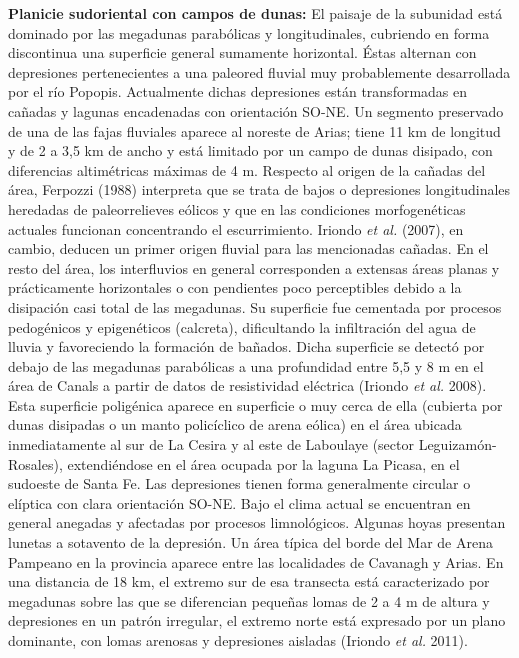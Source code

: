 \documentclass[10pt,a4paper, twoside]{report}
\begin{document}
\textbf{Planicie sudoriental con campos de dunas:} El paisaje de la subunidad está dominado por las megadunas parabólicas y longitudinales, cubriendo en forma discontinua una superficie general sumamente horizontal. Éstas alternan con depresiones  pertenecientes a una paleored fluvial muy probablemente desarrollada por el río Popopis. Actualmente dichas depresiones están transformadas en cañadas y lagunas encadenadas con orientación SO-NE. Un segmento preservado de una de las fajas fluviales aparece al noreste de Arias; tiene 11 km de longitud y de 2 a 3,5 km de ancho y está limitado por un campo de dunas disipado, con diferencias altimétricas máximas de 4 m. Respecto al origen de la cañadas del área, Ferpozzi (1988) interpreta que se trata de bajos o depresiones longitudinales heredadas de paleorrelieves eólicos y que en las condiciones morfogenéticas actuales funcionan concentrando el escurrimiento. Iriondo \textit{et al.} (2007), en cambio, deducen un primer origen fluvial para las mencionadas cañadas.
En el resto del área, los interfluvios en general corresponden a extensas áreas planas y prácticamente horizontales o con pendientes poco perceptibles debido a la disipación casi total de las megadunas. Su superficie fue cementada por procesos pedogénicos y epigenéticos (calcreta), dificultando la infiltración del agua de lluvia y favoreciendo la formación de bañados. Dicha superficie se detectó por debajo de las megadunas parabólicas a una profundidad entre 5,5 y 8 m en el área de Canals a partir de datos de resistividad eléctrica (Iriondo \textit{et al.} 2008). Esta superficie poligénica aparece en superficie o muy cerca de ella (cubierta por dunas disipadas o un manto policíclico de arena eólica) en el área ubicada inmediatamente al sur de La Cesira y al este de Laboulaye (sector Leguizamón-Rosales), extendiéndose en el área ocupada por la laguna La Picasa, en el sudoeste de Santa Fe. Las depresiones tienen forma generalmente circular o elíptica con clara orientación SO-NE. Bajo el clima actual se encuentran en general anegadas y afectadas por procesos limnológicos. Algunas hoyas presentan lunetas a sotavento de la depresión. Un área típica del borde del Mar de Arena Pampeano en la provincia aparece entre las localidades de Cavanagh y Arias. En una distancia de 18 km, el extremo sur de esa transecta está caracterizado por megadunas sobre las que se diferencian pequeñas lomas de 2 a 4 m de altura y depresiones en un patrón irregular, el extremo norte está expresado por un plano dominante, con lomas arenosas y depresiones aisladas (Iriondo \textit{et al.} 2011).
\end{document}
